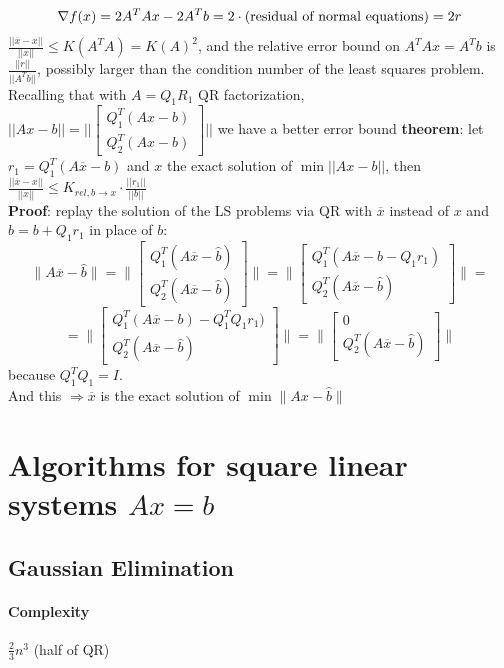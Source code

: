 \documentclass[10pt]{report}
\begin{document}
$$\nabla f(x) = 2A^TAx-2A^Tb = 2\cdot(\hbox{residual of normal equations}) = 2r$$
$\frac{||\overline{x}-x||}{||x||}\leq K(A^TA) = K(A)^2$, and the relative error bound on $A^TAx=A^Tb$ is $\frac{||r||}{||A^Tb||}$, possibly larger than the condition number of the least squares problem.\\
Recalling that with $A=Q_1R_1$ QR factorization, $||Ax-b||=||\left[\begin{array}{c}
Q_1^T(Ax-b)\\Q_2^T(Ax-b)
\end{array}\right]||$
we have a better error bound \textbf{theorem}: let $r_1 = Q_1^T(A\overline{x}-b)$ and $x$ the exact solution of $\min||Ax-b||$, then $\frac{||\overline{x}-x||}{||x||}\leq K_{rel, b\rightarrow x}\cdot\frac{||r_1||}{||b||}$\\
\textbf{Proof}: replay the solution of the LS problems via QR with $\overline{x}$ instead of $x$ and $\hat{b}=b+Q_1r_1$ in place of $b$: $$\|A\overline{x}-\hat{b}\| = \|\left[\begin{array}{c}
Q_1^T(A\overline{x}-\hat{b})\\Q_2^T(A\overline{x}-\hat{b})
\end{array}\right]\|=\|\left[\begin{array}{c}
Q_1^T(A\overline{x}-b-Q_1r_1)\\
Q_2^T(A\overline{x}-\hat{b})
\end{array}\right]\|=$$
$$=\|\left[\begin{array}{c}
Q_1^T(A\overline{x}-b)-Q_1^TQ_1r_1)\\
Q_2^T(A\overline{x}-\hat{b})
\end{array}\right]\|=\|\left[\begin{array}{c}
0\\
Q_2^T(A\overline{x}-\hat{b})
\end{array}\right]\|$$
because $Q_1^TQ_1=I$.\\
And this $\Rightarrow\overline{x}$ is the exact solution of $\min\|Ax-\hat{b}\|$
\section{Algorithms for square linear systems $Ax=b$}
\subsection{Gaussian Elimination}
\paragraph{Complexity} $\frac{2}{3}n^3$ (half of QR)
\end{document}
